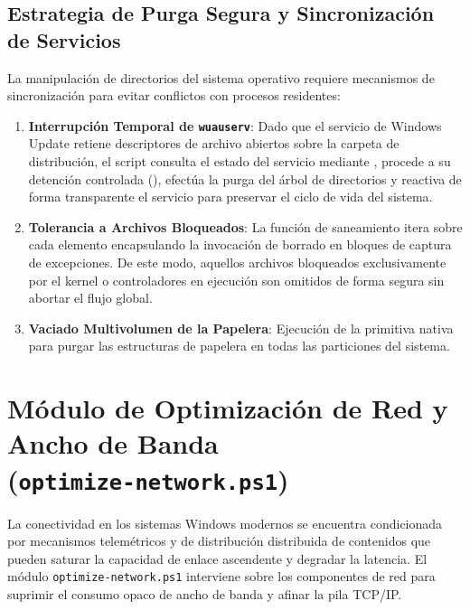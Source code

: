 \documentclass[12pt,a4paper]{report}
\begin{document}
\subsection{Estrategia de Purga Segura y Sincronización de Servicios}
La manipulación de directorios del sistema operativo requiere mecanismos de sincronización para evitar conflictos con procesos residentes:
\begin{enumerate}
    \item \textbf{Interrupción Temporal de \texttt{wuauserv}}: Dado que el servicio de Windows Update retiene descriptores de archivo abiertos sobre la carpeta de distribución, el script consulta el estado del servicio mediante , procede a su detención controlada (), efectúa la purga del árbol de directorios y reactiva de forma transparente el servicio para preservar el ciclo de vida del sistema.
    \item \textbf{Tolerancia a Archivos Bloqueados}: La función de saneamiento itera sobre cada elemento encapsulando la invocación de borrado en bloques de captura de excepciones. De este modo, aquellos archivos bloqueados exclusivamente por el kernel o controladores en ejecución son omitidos de forma segura sin abortar el flujo global.
    \item \textbf{Vaciado Multivolumen de la Papelera}: Ejecución de la primitiva nativa  para purgar las estructuras de papelera en todas las particiones del sistema.
\end{enumerate}

\section[Módulo de Optimización de Red y Ancho de Banda]{Módulo de Optimización de Red y Ancho de Banda\\ \large(\texttt{optimize-network.ps1})}
La conectividad en los sistemas Windows modernos se encuentra condicionada por mecanismos telemétricos y de distribución distribuida de contenidos que pueden saturar la capacidad de enlace ascendente y degradar la latencia. El módulo \texttt{optimize-network.ps1} interviene sobre los componentes de red para suprimir el consumo opaco de ancho de banda y afinar la pila TCP/IP.
\end{document}
